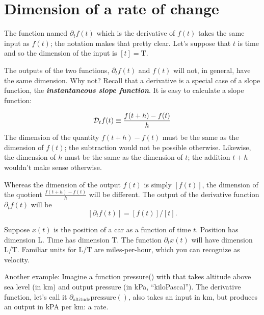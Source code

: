 \documentclass[
  letterpaper,
  DIV=11,
  numbers=noendperiod,
  oneside]{scrreprt}
\begin{document}
\hypertarget{dimension-of-a-rate-of-change}{%
\section{Dimension of a rate of
change}\label{dimension-of-a-rate-of-change}}

The function named \(\partial_t f(t)\) which is the derivative of
\(f(t)\) takes the same input as \(f(t)\); the notation makes that
pretty clear. Let's suppose that \(t\) is time and so the dimension of
the input is \([t] = \text{T}\).

The outputs of the two functions, \(\partial_t f(t)\) and \(f(t)\) will
not, in general, have the same dimension. Why not? Recall that a
derivative is a special case of a slope function, the
\textbf{\emph{instantaneous slope function}}. It is easy to calculate a
slope function:

\[{\cal D}_t f(t) \equiv \frac{f(t+h) - f(t)}{h}\] The dimension of the
quantity \(f(t+h) - f(t)\) must be the same as the dimension of
\(f(t)\); the subtraction would not be possible otherwise. Likewise, the
dimension of \(h\) must be the same as the dimension of \(t\); the
addition \(t+h\) wouldn't make sense otherwise.


Whereas the dimension of the output \(f(t)\) is simply
\(\left[f(t)\right]\), the dimension of the quotient
\(\frac{f(t+h) - f(t)}{h}\) will be different. The output of the
derivative function \(\partial_t f(t)\) will be
\[\left[\partial_t f(t)\right] = \left[f(t)\right] / \left[t\right] .\]

Suppose \(x(t)\) is the position of a car as a function of time \(t\).
Position has dimension L. Time has dimension T. The function
\(\partial_t x(t)\) will have dimension L/T. Familiar units for L/T are
miles-per-hour, which you can recognize as velocity.

Another example: Imagine a function pressure() with that takes altitude
above sea level (in km) and output pressure (in kPa,
``kiloPascal''). The derivative function, let's call it
\(\partial_\text{altitude} \text{pressure}()\), also takes an input in
km, but produces an output in kPA per km: a rate.
\end{document}
